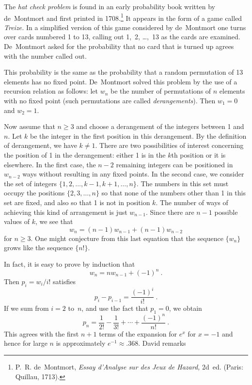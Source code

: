 The {\em hat check problem} is found in an early probability book written
by de~Montmort and first printed in 1708.\footnote{P.~R. de~Montmort, {\em
Essay d'Analyse sur des Jeux de Hazard,} 2d~ed. (Paris: Quillau, 1713).}  It appears in the form of
a game called {\em Treize.}  In a simplified version of this game considered by
de~Montmort one turns over cards numbered 1 to 13, calling out 1,~2, \dots,~13 as the cards are
examined.  De~Montmort asked for the probability that no card that is turned up agrees
with the number called out.
\par
This probability is the same as the probability that a random permutation of 13
elements has no fixed point.  De~Montmort solved this problem by the use of a recursion
relation as follows:  let $w_n$ be the number of permutations of $n$ elements with no
fixed point (such permutations are called {\em derangements}).  Then $w_1 = 0$
and
$w_2 = 1$.
\par Now assume that $n \ge 3$ and choose a derangement of the integers between 1 and
$n$.  Let
$k$ be the integer in the first position in this derangement.  By the definition of
derangement, we have $k \ne 1$.  There are two possibilities of interest concerning the
position of 1 in the derangement:  either 1 is in the $k$th position or it is
elsewhere.   In the first case, the $n-2$ remaining integers can be positioned in
$w_{n-2}$ ways without resulting in any fixed points.  In the second case, we consider
the set  of integers $\{1, 2, \ldots, k-1, k+1, \ldots, n\}$.  The numbers in this
set must occupy the positions $\{2, 3, \ldots, n\}$ so that none of the numbers other
than 1 in  this set are fixed, and also so that 1 is not in position $k$.  The number
of ways of achieving this kind of arrangement is just $w_{n-1}$.  Since there are
$n-1$ possible values of $k$, we see that
$$ w_n = (n - 1)w_{n - 1} + (n - 1)w_{n -2}
$$ for $n \ge 3$.  One might conjecture from this last equation that the sequence
$\{w_n\}$ grows like the sequence $\{n!\}$.  
\par In fact, it is easy to prove by induction that
$$ w_n = nw_{n - 1} + (-1)^n\ .
$$ Then $p_i = w_i/i!$ satisfies
$$ p_i - p_{i - 1} = \frac{(-1)^i}{i!}\ .
$$ If we sum from $i = 2$ to~$n$, and use the fact that $p_1 = 0$, we obtain
$$ p_n = \frac1{2!} - \frac1{3!} + \cdots + \frac{(-1)^n}{n!}\ .
$$ This agrees with the first $n + 1$ terms of the expansion for $e^x$ for $x = -1$
and hence for large $n$ is approximately $e^{-1} \approx .368$.  David remarks

